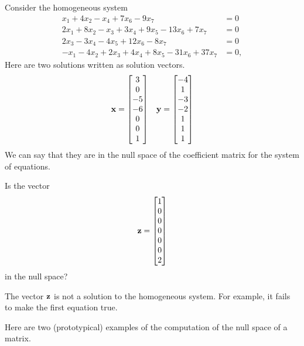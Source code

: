 \documentclass{ximera}
\begin{document}
\begin{example}
  Consider the homogeneous system
  \begin{align*}
    x_1 +4x_2  - x_4  + 7x_6 - 9x_7 &= 0\\
    2x_1 + 8x_2 - x_3 + 3x_4 + 9x_5 - 13x_6 + 7x_7 &= 0\\
    2x_3 -3x_4 -4x_5 +12x_6 -8x_7 &= 0\\
    -x_1  - 4x_2 + 2x_3 +4x_4 + 8x_5 - 31x_6 + 37x_7 &= 0,
  \end{align*}
  Here are two solutions written as solution vectors.
  \begin{align*}
    \mathbf{x}=\begin{bmatrix}3\\0\\-5\\-6\\0\\0\\1\end{bmatrix}&&
    \mathbf{y}=\begin{bmatrix}-4\\1\\-3\\-2\\1\\1\\1\end{bmatrix}
  \end{align*}
  We can say that they are in the null space of the coefficient matrix
  for the system of equations.

  Is the vector
  \[
    \mathbf{z}=\begin{bmatrix}1\\0\\0\\0\\0\\0\\2\end{bmatrix}
  \]
  in the null space?

  \begin{multipleChoice}
  \end{multipleChoice}

  \begin{feedback}
    The vector $\mathbf{z}$ is not a solution to the homogeneous system.  For example, it fails to make the first equation true.
  \end{feedback}
\end{example}

Here are two (prototypical) examples of the computation of the null space of a matrix.
\end{document}
